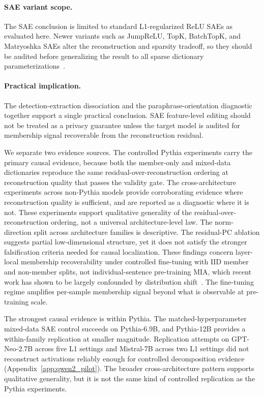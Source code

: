\paragraph{SAE variant scope.}
The SAE conclusion is limited to standard L1-regularized ReLU SAEs as evaluated here. Newer variants such as JumpReLU, TopK, BatchTopK, and Matryoshka SAEs alter the reconstruction and sparsity tradeoff, so they should be audited before generalizing the result to all sparse dictionary parameterizations~\citep{rajamanoharan2024jumping,gao2025scaling,bussmann2024batchtopk,bussmann2025matryoshka}.

\paragraph{Practical implication.}
The detection-extraction dissociation and the paraphrase-orientation diagnostic together support a single practical conclusion. SAE feature-level editing should not be treated as a privacy guarantee unless the target model is audited for membership signal recoverable from the reconstruction residual.

We separate two evidence sources. The controlled Pythia experiments carry the primary causal evidence, because both the member-only and mixed-data dictionaries reproduce the same residual-over-reconstruction ordering at reconstruction quality that passes the validity gate. The cross-architecture experiments across non-Pythia models provide corroborating evidence where reconstruction quality is sufficient, and are reported as a diagnostic where it is not. These experiments support qualitative generality of the residual-over-reconstruction ordering, not a universal architecture-level law. The norm-direction split across architecture families is descriptive. The residual-PC ablation suggests partial low-dimensional structure, yet it does not satisfy the stronger falsification criteria needed for causal localization. These findings concern layer-local membership recoverability under controlled fine-tuning with IID member and non-member splits, not individual-sentence pre-training MIA, which recent work has shown to be largely confounded by distribution shift~\citep{maini2024dataset, duan2024membership}. The fine-tuning regime amplifies per-sample membership signal beyond what is observable at pre-training scale.

The strongest causal evidence is within Pythia. The matched-hyperparameter mixed-data SAE control succeeds on Pythia-6.9B, and Pythia-12B provides a within-family replication at smaller magnitude. Replication attempts on GPT-Neo-2.7B across five L1 settings and Mistral-7B across two L1 settings did not reconstruct activations reliably enough for controlled decomposition evidence (Appendix~\ref{app:qwen2_pilot}). The broader cross-architecture pattern supports qualitative generality, but it is not the same kind of controlled replication as the Pythia experiments.

